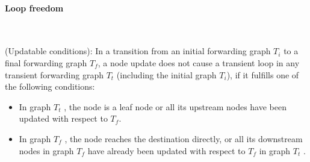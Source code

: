 \paragraph{Loop freedom}~\cite{loopfree}

\begin{theorem} (Updatable conditions): In a transition from an initial
forwarding graph $T_i$ to a final forwarding graph $T_f$, a node update does not
cause a transient loop in any transient forwarding graph $T_t$ (including the
initial graph $T_i$), if it fulfills one of the following conditions:
\begin{itemize}[noitemsep,topsep=0pt,leftmargin=*]
\item In graph $T_t$ , the node is a leaf node or all its
upstream nodes have been updated with respect to $T_f$.
\item In graph $T_f$
, the node reaches the destination directly, or all its downstream nodes in
graph $T_f$ have already been updated with respect to $T_f$ in graph $T_t$ .
\end{itemize}
\end{theorem}

%
%

